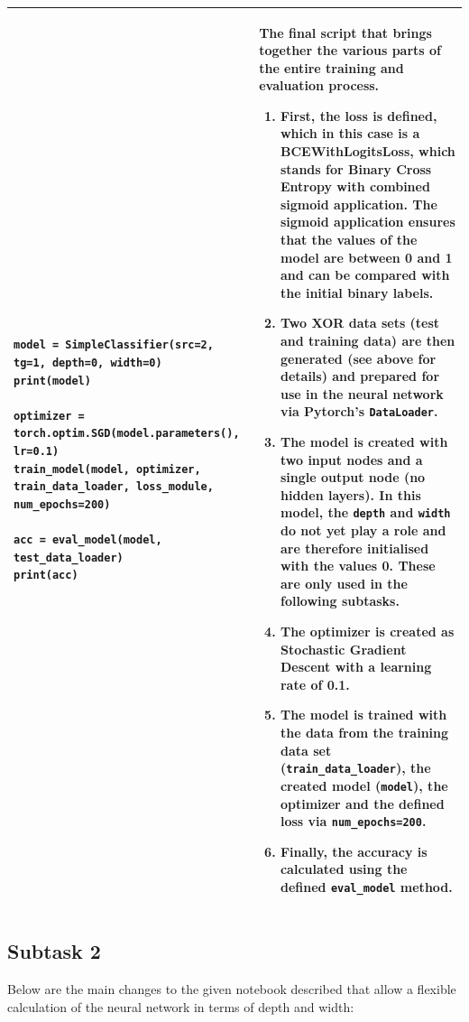 \begin{longtable}{|m{}|m{}|}
\begin{lstlisting}
model = SimpleClassifier(src=2, tg=1, depth=0, width=0)
print(model)

optimizer = torch.optim.SGD(model.parameters(), lr=0.1)
train_model(model, optimizer, train_data_loader, loss_module, num_epochs=200)

acc = eval_model(model, test_data_loader)
print(acc)
\end{lstlisting} & The final script that brings together the various parts of the entire training and evaluation process.
\begin{enumerate}
    \item First, the loss is defined, which in this case is a BCEWithLogitsLoss, which stands for Binary Cross Entropy with combined sigmoid application. The sigmoid application ensures that the values of the model are between 0 and 1 and can be compared with the initial binary labels. 
    \item Two XOR data sets (test and training data) are then generated (see above for details) and prepared for use in the neural network via Pytorch's \lstinline|DataLoader|.
    \item The model is created with two input nodes and a single output node (no hidden layers). In this model, the \lstinline|depth| and \lstinline|width| do not yet play a role and are therefore initialised with the values 0. These are only used in the following subtasks.
    \item The optimizer is created as Stochastic Gradient Descent with a learning rate of 0.1.
    \item The model is trained with the data from the training data set (\lstinline|train_data_loader|), the created model (\lstinline|model|), the optimizer and the defined loss via \lstinline|num_epochs=200|.
    \item Finally, the accuracy is calculated using the defined \lstinline|eval_model| method.
\end{enumerate} \\ \hline
\end{longtable}

\normalsize

\clearpage

\subsection*{Subtask 2}

Below are the main changes to the given notebook described that allow a flexible calculation of the neural network in terms of depth and width:

